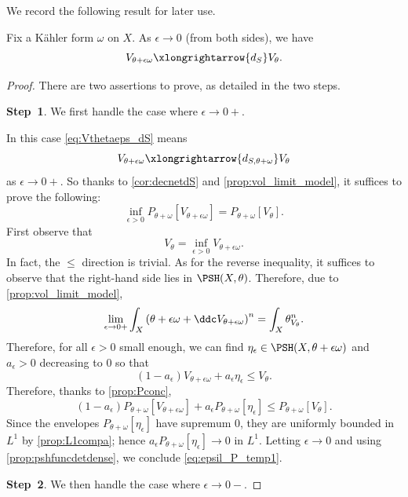 We record the following result for later use.
\begin{lemma}\label{lma:Vthetaepsconv}
Fix a Kähler form $\omega$ on $X$.
As $\epsilon\to 0$ (from both sides), we have
\begin{equation}\label{eq:Vthetaeps_dS}
    V_{\theta+\epsilon\omega}\xlongrightarrow{d_S}V_{\theta}.
\end{equation}
\end{lemma}
\begin{proof}
There are two assertions to prove, as detailed in the two steps.

\textbf{Step~1}. We first handle the case where $\epsilon\to 0+$.

In this case \eqref{eq:Vthetaeps_dS} means
\[
    V_{\theta+\epsilon\omega}\xlongrightarrow{d_{S,\theta+\omega}}V_{\theta}
\]
as $\epsilon\to 0+$. So thanks to \cref{cor:decnetdS} and \cref{prop:vol_limit_model}, it suffices to prove the following:
\begin{equation}\label{eq:epsil_P_temp1}
    \inf_{\epsilon>0} P_{\theta+\omega}\left[ V_{\theta+\epsilon\omega} \right]=P_{\theta+\omega}\left[ V_{\theta} \right].
\end{equation}
First observe that
\[
V_{\theta}=\inf_{\epsilon>0} V_{\theta+\epsilon\omega}.
\]
In fact, the $\leq$ direction is trivial. As for the reverse inequality, it suffices to observe that the right-hand side lies in $\PSH(X,\theta)$.
Therefore, due to \cref{prop:vol_limit_model},
\[
\lim_{\epsilon \to 0+} \int_X \left( \theta+\epsilon\omega+\ddc V_{\theta+\epsilon\omega} \right)^n=\int_X \theta_{V_{\theta}}^n.
\]
Therefore, for all $\epsilon>0$ small enough, we can find $\eta_{\epsilon}\in \PSH(X,\theta+\epsilon\omega)$ and $a_{\epsilon}>0$ decreasing to $0$ so that
\[
(1-a_\epsilon)V_{\theta+\epsilon \omega} + a_\epsilon \eta_\epsilon \leq V_{\theta}.
\]
Therefore, thanks to \cref{prop:Pconc},
\[
(1-a_\epsilon)P_{\theta+\omega}\left[ V_{\theta+\epsilon \omega} \right] + a_\epsilon P_{\theta+\omega}\left[\eta_\epsilon\right] \leq P_{\theta+\omega}\left[V_{\theta}\right].
\]
Since the envelopes $P_{\theta+\omega}[\eta_\epsilon]$ have supremum $0$, they are uniformly bounded in $L^1$ by \cref{prop:L1compa}; hence $a_\epsilon P_{\theta+\omega}[\eta_\epsilon]\to 0$ in $L^1$. Letting $\epsilon\to 0$ and using \cref{prop:pshfuncdetdense}, we conclude \eqref{eq:epsil_P_temp1}.

\textbf{Step~2}. We then handle the case where $\epsilon\to 0-$.


\end{proof}
